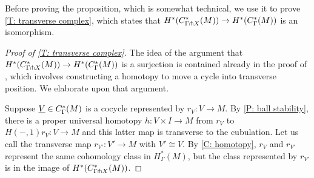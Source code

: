 Before proving the proposition, which is somewhat technical, we use it to prove \cref{T: transverse complex}, which states that $H^*(C^*_{\Gamma \pitchfork X}(M)) \to H^*(C_\Gamma^*(M))$ is an isomorphism.

\begin{proof}[Proof of \cref{T: transverse complex}]
	The idea of the argument that $H^*(C^*_{\Gamma \pitchfork X}(M)) \to H^*(C_\Gamma^*(M))$ is a surjection is contained already in the proof of \cite[Lemma 15]{Lipy14}, which involves constructing a homotopy to move a cycle into transverse position.
	We elaborate upon that argument.

	Suppose $\underline{V} \in C_\Gamma^*(M)$ is a cocycle represented by $r_V \colon V \to M$.
	By \cref{P: ball stability}, there is a proper universal homotopy $h \colon V \times I \to M$ from $r_V$ to $H(-,1)r_{V} \colon V \to M$ and this latter map is transverse to the cubulation.
	Let us call the transverse map $r_{V'} \colon V' \to M$ with $V' \cong V$.
	By \cref{C: homotopy}, $r_V$ and $r_{V'}$ represent the same cohomology class in $H^*_{\Gamma}(M)$, but the class represented by $r_{V'}$ is in the image of $H^*(C^*_{\Gamma \pitchfork X}(M))$.


\end{proof}
